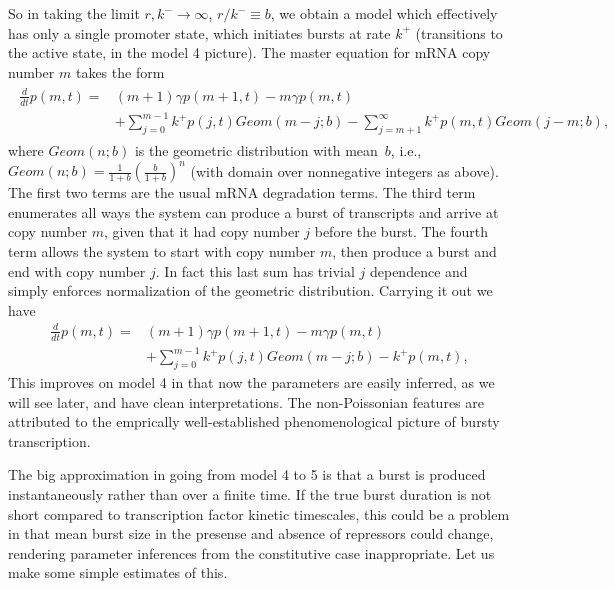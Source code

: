 \documentclass[12pt]{article}%
\newcommand{\deriv}[2][{}]{\frac{d #1}{d #2}}
\begin{document}
So in taking the limit $r,k^-\rightarrow\infty$, $r/k^-\equiv b$,
we obtain a model which effectively has only a single promoter state,
which initiates bursts at rate $k^+$
(transitions to the active state, in the model 4 picture).
The master equation for mRNA copy number $m$ takes the form
\begin{align}
\begin{split}
\deriv{t}{p(m,t)} = & (m+1)\gamma p(m+1,t) - m\gamma p(m,t) \\
        &+ \sum_{j=0}^{m-1} k^+ p(j,t) Geom(m-j;b)
         - \sum_{j=m+1}^\infty k^+ p(m,t) Geom(j-m;b),
\end{split}
\end{align}
where $Geom(n;b)$ is the geometric distribution with mean~$b$, i.e.,
$Geom(n;b) = \frac{1}{1+b}\left(\frac{b}{1+b}\right)^n$
(with domain over nonnegative integers as above).
The first two terms are the usual mRNA degradation terms.
The third term enumerates all ways the system can produce
a burst of transcripts and arrive at copy number $m$,
given that it had copy number $j$ before the burst.
The fourth term allows the system to start with copy number $m$,
then produce a burst and end with copy number $j$.
In fact this last sum has trivial $j$ dependence and
simply enforces normalization of the geometric distribution.
Carrying it out we have
\begin{equation}
\begin{split}
\deriv{t}{p(m,t)} = & (m+1)\gamma p(m+1,t) - m\gamma p(m,t) \\
        &+ \sum_{j=0}^{m-1} k^+ p(j,t) Geom(m-j;b)
            - k^+ p(m,t),
\end{split}
\end{equation}
This improves on model 4 in that now the parameters are easily inferred,
as we will see later, and have clean interpretations.
The non-Poissonian features are attributed to the emprically
well-established phenomenological picture of bursty transcription.

The big approximation in going from model 4 to 5 is that a burst
is produced instantaneously rather than over a finite time.
If the true burst duration is not short compared to transcription factor
kinetic timescales, this could be a problem in that mean burst size
in the presense and absence of repressors could change,
rendering parameter inferences from the constitutive case inappropriate.
Let us make some simple estimates of this.
\end{document}
